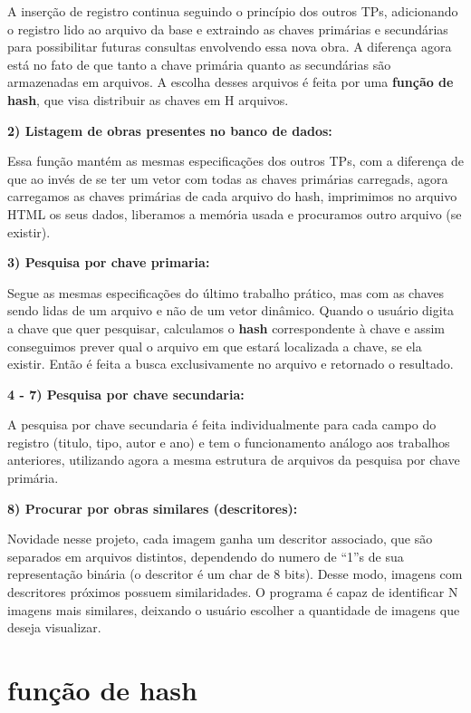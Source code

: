 \documentclass{article}
\begin{document}
A inserção de registro continua seguindo o princípio dos outros TPs, adicionando o registro lido ao arquivo da base e extraindo as chaves primárias e secundárias para possibilitar futuras consultas envolvendo essa nova obra. A diferença agora está no fato de que tanto a chave primária quanto as secundárias são armazenadas em arquivos. A escolha desses arquivos é feita por uma \textbf{função de hash}, que visa distribuir as chaves em H arquivos.



\textbf{2) Listagem de obras presentes no banco de dados:}

Essa função mantém as mesmas especificações dos outros TPs, com a diferença de que ao invés de se ter um vetor com todas as chaves primárias carregads, agora carregamos as chaves primárias de cada arquivo do hash, imprimimos no arquivo HTML os seus dados, liberamos a memória usada e procuramos outro arquivo (se existir).



\textbf{3) Pesquisa por chave primaria:}

Segue as mesmas especificações do último trabalho prático, mas com as chaves sendo lidas de um arquivo e não de um vetor dinâmico. Quando o usuário digita a chave que quer pesquisar, calculamos o \textbf{hash} correspondente à chave e assim conseguimos prever qual o arquivo em que estará localizada a chave, se ela existir. Então é feita a busca exclusivamente no arquivo e retornado o resultado. 



\textbf{4 - 7) Pesquisa por chave secundaria:}

A pesquisa por chave secundaria é feita individualmente para cada campo do registro (titulo, tipo, autor e ano) e tem o funcionamento análogo aos trabalhos anteriores, utilizando agora a mesma estrutura de arquivos da pesquisa por chave primária.


\textbf{8) Procurar por obras similares (descritores):}

Novidade nesse projeto, cada imagem ganha um descritor associado, que são separados em arquivos distintos, dependendo do numero de ``1''s de sua representação binária (o descritor é um char de 8 bits).
Desse modo, imagens com descritores próximos possuem similaridades. O programa é capaz de identificar N imagens mais similares, deixando o usuário escolher a quantidade de imagens que deseja visualizar.


\section{função de hash}\
\end{document}
